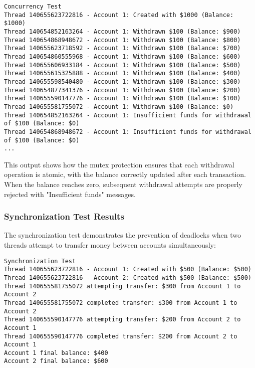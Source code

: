 \documentclass[12pt]{article}
\begin{document}
\begin{lstlisting}[style=consolestyle, caption=Sample Output: Concurrency Test]
Concurrency Test
Thread 140655623722816 - Account 1: Created with $1000 (Balance: $1000)
Thread 140654852163264 - Account 1: Withdrawn $100 (Balance: $900)
Thread 140654868948672 - Account 1: Withdrawn $100 (Balance: $800)
Thread 140655623718592 - Account 1: Withdrawn $100 (Balance: $700)
Thread 140654860555968 - Account 1: Withdrawn $100 (Balance: $600)
Thread 140655606933184 - Account 1: Withdrawn $100 (Balance: $500)
Thread 140655615325888 - Account 1: Withdrawn $100 (Balance: $400)
Thread 140655598540480 - Account 1: Withdrawn $100 (Balance: $300)
Thread 140654877341376 - Account 1: Withdrawn $100 (Balance: $200)
Thread 140655590147776 - Account 1: Withdrawn $100 (Balance: $100)
Thread 140655581755072 - Account 1: Withdrawn $100 (Balance: $0)
Thread 140654852163264 - Account 1: Insufficient funds for withdrawal of $100 (Balance: $0)
Thread 140654868948672 - Account 1: Insufficient funds for withdrawal of $100 (Balance: $0)
...
\end{lstlisting}

This output shows how the mutex protection ensures that each withdrawal operation is atomic, with the balance correctly updated after each transaction. When the balance reaches zero, subsequent withdrawal attempts are properly rejected with "Insufficient funds" messages.

\subsubsection{Synchronization Test Results}
The synchronization test demonstrates the prevention of deadlocks when two threads attempt to transfer money between accounts simultaneously:

\begin{lstlisting}[style=consolestyle, caption=Sample Output: Synchronization Test]
Synchronization Test
Thread 140655623722816 - Account 1: Created with $500 (Balance: $500)
Thread 140655623722816 - Account 2: Created with $500 (Balance: $500)
Thread 140655581755072 attempting transfer: $300 from Account 1 to Account 2
Thread 140655581755072 completed transfer: $300 from Account 1 to Account 2
Thread 140655590147776 attempting transfer: $200 from Account 2 to Account 1
Thread 140655590147776 completed transfer: $200 from Account 2 to Account 1
Account 1 final balance: $400
Account 2 final balance: $600
\end{lstlisting}
\end{document}
